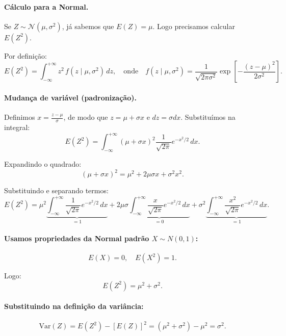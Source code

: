\paragraph{Cálculo para a Normal.}
Se $Z \sim \mathcal N(\mu, \sigma^2)$, já sabemos que $E(Z)=\mu$.
Logo precisamos calcular $E(Z^2)$.

Por definição:
\[
E(Z^2) = \int_{-\infty}^{+\infty} z^2\,f(z\mid\mu,\sigma^2)\,dz,
\quad\text{onde}\quad
f(z\mid\mu,\sigma^2)=\frac{1}{\sqrt{2\pi\sigma^2}}\exp\!\left[-\frac{(z-\mu)^2}{2\sigma^2}\right].
\]

\paragraph{Mudança de variável (padronização).}
Definimos $x = \frac{z-\mu}{\sigma}$, de modo que $z = \mu + \sigma x$ e $dz = \sigma dx$.
Substituímos na integral:
\[
E(Z^2)
= \int_{-\infty}^{+\infty} (\mu+\sigma x)^2 \frac{1}{\sqrt{2\pi}}e^{-x^2/2}\,dx.
\]

Expandindo o quadrado:
\[
(\mu+\sigma x)^2 = \mu^2 + 2\mu\sigma x + \sigma^2 x^2.
\]

Substituindo e separando termos:
\[
E(Z^2)
= \mu^2\underbrace{\int_{-\infty}^{+\infty}\frac{1}{\sqrt{2\pi}}e^{-x^2/2}\,dx}_{=1}
+ 2\mu\sigma\underbrace{\int_{-\infty}^{+\infty}\frac{x}{\sqrt{2\pi}}e^{-x^2/2}\,dx}_{=0}
+ \sigma^2\underbrace{\int_{-\infty}^{+\infty}\frac{x^2}{\sqrt{2\pi}}e^{-x^2/2}\,dx}_{=1}.
\]

\paragraph{Usamos propriedades da Normal padrão $X\sim N(0,1)$:}
\[
E(X)=0, \quad E(X^2)=1.
\]

Logo:
\[
E(Z^2)=\mu^2 + \sigma^2.
\]

\paragraph{Substituindo na definição da variância:}
\[
\mathrm{Var}(Z) = E(Z^2) - [E(Z)]^2 = (\mu^2+\sigma^2) - \mu^2 = \sigma^2.
\]

